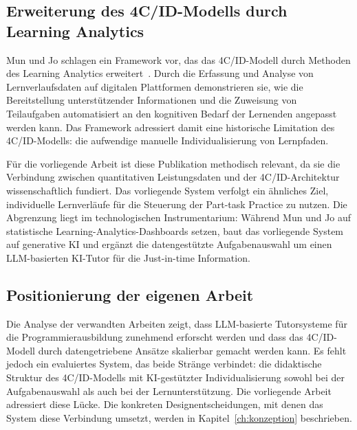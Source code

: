 \subsection{Erweiterung des 4C/ID-Modells durch Learning Analytics}\label{subsec:mun-jo}

Mun und Jo schlagen ein Framework vor, das das 4C/ID-Modell durch Methoden des Learning Analytics erweitert~\cite{mun2025evolving}.
Durch die Erfassung und Analyse von Lernverlaufsdaten auf digitalen Plattformen demonstrieren sie, wie die Bereitstellung unterstützender Informationen und die Zuweisung von Teilaufgaben automatisiert an den kognitiven Bedarf der Lernenden angepasst werden kann. Das Framework adressiert damit eine historische Limitation des 4C/ID-Modells: die aufwendige manuelle Individualisierung von Lernpfaden.

Für die vorliegende Arbeit ist diese Publikation methodisch relevant, da sie die Verbindung zwischen quantitativen Leistungsdaten und der 4C/ID-Architektur wissenschaftlich fundiert. Das vorliegende System verfolgt ein ähnliches Ziel, individuelle Lernverläufe für die Steuerung der Part-task Practice zu nutzen. Die Abgrenzung liegt im technologischen Instrumentarium: Während Mun und Jo auf statistische Learning-Analytics-Dashboards setzen, baut das vorliegende System auf generative KI und ergänzt die datengestützte Aufgabenauswahl um einen LLM-basierten KI-Tutor für die Just-in-time Information.

\subsection{Positionierung der eigenen Arbeit}\label{subsec:positionierung}

Die Analyse der verwandten Arbeiten zeigt, dass LLM-basierte Tutorsysteme für die Programmierausbildung zunehmend erforscht werden und dass das 4C/ID-Modell durch datengetriebene Ansätze skalierbar gemacht werden kann. Es fehlt jedoch ein evaluiertes System, das beide Stränge verbindet: die didaktische Struktur des 4C/ID-Modells mit KI-gestützter Individualisierung sowohl bei der Aufgabenauswahl als auch bei der Lernunterstützung. Die vorliegende Arbeit adressiert diese Lücke. Die konkreten Designentscheidungen, mit denen das System diese Verbindung umsetzt, werden in Kapitel~\ref{ch:konzeption} beschrieben.


